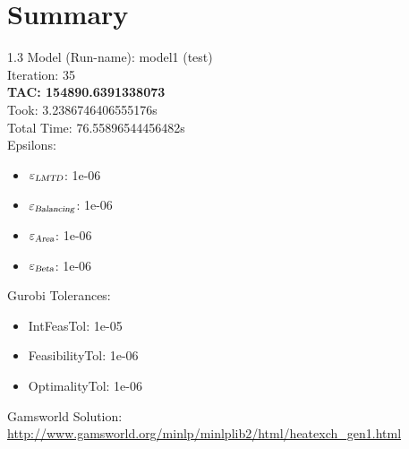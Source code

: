 \documentclass{article}%
\begin{document}
%
\normalsize%
\section{Summary}%
\thispagestyle{plain}%
\begin{spacing}{1.3}%
\Large%
Model (Run-name): model1 (test)\\%
Iteration: 35\\%
\textbf{TAC: 154890.6391338073}\\%
Took: 3.2386746406555176s\\%
Total Time: 76.55896544456482s\\%
Epsilons:%
\begin{itemize}%
	\item $\varepsilon_{\textsl{LMTD}}$: 1e-06%
	\item $\varepsilon_{\textsl{Balancing}}$: 1e-06%
	\item $\varepsilon_{\textsl{Area}}$: 1e-06%
	\item $\varepsilon_{\textsl{Beta}}$: 1e-06%
\end{itemize}%
Gurobi Tolerances:%
\begin{itemize}%
	\item IntFeasTol: 1e-05%
	\item FeasibilityTol: 1e-06%
	\item OptimalityTol: 1e-06%
\end{itemize}%
\end{spacing}%
\normalsize%
Gamsworld Solution: \url{http://www.gamsworld.org/minlp/minlplib2/html/heatexch_gen1.html}%
%
\clearpage%
\end{document}
